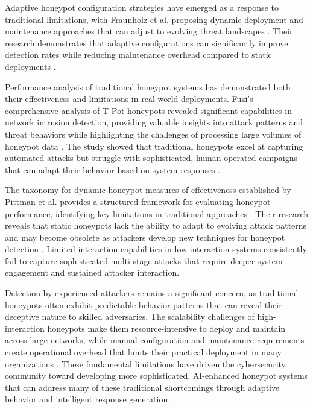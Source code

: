 Adaptive honeypot configuration strategies have emerged as a response to traditional limitations, with Fraunholz et al. proposing dynamic deployment and maintenance approaches that can adjust to evolving threat landscapes \cite{frauenholz2017}. Their research demonstrates that adaptive configurations can significantly improve detection rates while reducing maintenance overhead compared to static deployments \cite{frauenholz2017}.

Performance analysis of traditional honeypot systems has demonstrated both their effectiveness and limitations in real-world deployments. Fuzi's comprehensive analysis of T-Pot honeypots revealed significant capabilities in network intrusion detection, providing valuable insights into attack patterns and threat behaviors while highlighting the challenges of processing large volumes of honeypot data \cite{fuzi2024}. The study showed that traditional honeypots excel at capturing automated attacks but struggle with sophisticated, human-operated campaigns that can adapt their behavior based on system responses \cite{fuzi2024}.

The taxonomy for dynamic honeypot measures of effectiveness established by Pittman et al. provides a structured framework for evaluating honeypot performance, identifying key limitations in traditional approaches \cite{pittman2020taxonomy}. Their research reveals that static honeypots lack the ability to adapt to evolving attack patterns and may become obsolete as attackers develop new techniques for honeypot detection \cite{pittman2020taxonomy}. Limited interaction capabilities in low-interaction systems consistently fail to capture sophisticated multi-stage attacks that require deeper system engagement and sustained attacker interaction.

Detection by experienced attackers remains a significant concern, as traditional honeypots often exhibit predictable behavior patterns that can reveal their deceptive nature to skilled adversaries. The scalability challenges of high-interaction honeypots make them resource-intensive to deploy and maintain across large networks, while manual configuration and maintenance requirements create operational overhead that limits their practical deployment in many organizations \cite{pittman2020taxonomy}. These fundamental limitations have driven the cybersecurity community toward developing more sophisticated, AI-enhanced honeypot systems that can address many of these traditional shortcomings through adaptive behavior and intelligent response generation.


